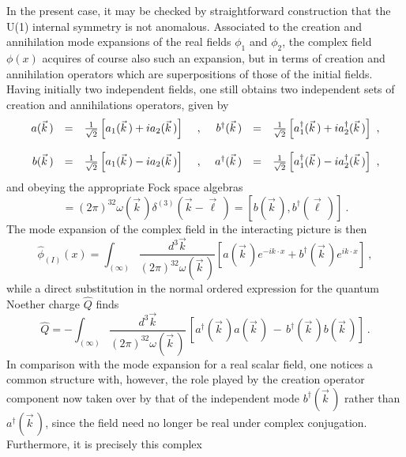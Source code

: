 \documentclass[a4paper,11pt]{article}
\begin{document}
In the present case, it may be checked by straightforward construction that
the U(1) internal symmetry is not anomalous. Associated to the creation and
annihilation mode expansions of the real fields $\phi_1$ and $\phi_2$, the
complex field $\phi(x)$ acquires of course also such an expansion, but
in terms of creation and annihilation operators which are superpositions
of those of the initial fields. Having initially two independent fields,
one still obtains two independent sets of creation and annihilations
operators, given by
\begin{equation}
\begin{array}{r c l c r c l}
a(\vec{k}\,)&=&\frac{1}{\sqrt{2}}\left[a_1(\vec{k}\,)+ia_2(\vec{k}\,)\right]\
&,&\
b^\dagger(\vec{k}\,)&=&\frac{1}{\sqrt{2}}\left[a^\dagger_1(\vec{k}\,)+
ia^\dagger_2(\vec{k}\,)\right]\ ,\\
 & & & & \\
b(\vec{k}\,)&=&\frac{1}{\sqrt{2}}\left[a_1(\vec{k}\,)-ia_2(\vec{k}\,)\right]\
&,&\
a^\dagger(\vec{k}\,)&=&\frac{1}{\sqrt{2}}\left[a^\dagger_1(\vec{k}\,)-
ia^\dagger_2(\vec{k}\,)\right]\ ,
\end{array}
\end{equation}
and obeying the appropriate Fock space algebras
\begin{equation}
[a(\vec{k}\,),a^\dagger(\vec{\ell}\,)]=(2\pi)^32\omega(\vec{k}\,)
\delta^{(3)}\left(\vec{k}-\vec{\ell}\,\right)=
[b(\vec{k}\,),b^\dagger(\vec{\ell}\,)]\ .
\end{equation}
The mode expansion of the complex field in the interacting picture is then
\begin{equation}
\hat{\phi}_{(I)}(x)=\int_{(\infty)}\frac{d^3\vec{k}}
{(2\pi)^32\omega(\vec{k}\,)}\left[a(\vec{k}\,)e^{-ik\cdot x}+
b^\dagger(\vec{k}\,)e^{ik\cdot x}\right]\ ,
\end{equation}
while a direct substitution in the normal ordered expression for the quantum
Noether charge $\hat{Q}$ finds
\begin{equation}
\hat{Q}=-\int_{(\infty)}\frac{d^3\vec{k}}{(2\pi)^32\omega(\vec{k}\,)}\,
\left[a^\dagger(\vec{k}\,)a(\vec{k}\,)\,-\,
b^\dagger(\vec{k}\,)b(\vec{k}\,)\right]\ .
\end{equation}
In comparison with the mode expansion for a real scalar field, one notices
a common structure with, however, the role played by the creation operator
component now taken over by that of the independent mode $b^\dagger(\vec{k}\,)$
rather than $a^\dagger(\vec{k}\,)$, since the field need no longer be real
under complex conjugation. Furthermore, it is precisely this complex
\end{document}
